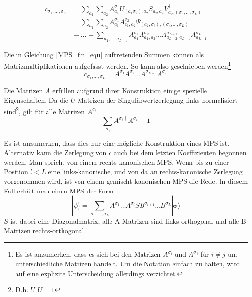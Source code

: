 \documentclass[10pt,a4paper]{report}
\newcommand{\SumIndex}{\sigma_1,\ldots,\sigma_L}
\begin{document}
\begin{equation}
\label{MPS_fin_equ}
\begin{split}
c_{\SumIndex}&=\sum_{a_1}\sum_{a_2}A_{a_1}^{\sigma_1}U_{(a_1 \sigma_2),a_2}S_{a_2,a_2}V_{a_2,(\sigma_3,\ldots,\sigma_L)}^\dagger\\
&=\sum_{a_1}\sum_{a_2}A_{a_1}^{\sigma_1}A_{a_1,a_2}^{\sigma_2}\Psi_{(a_2,\sigma_3),(\sigma_4,\ldots,\sigma_L)}\\
&=\ldots=\sum_{a_1,\ldots,a_{L-1}}A_{a_1}^{\sigma_1}A_{a_1,a_2}^{\sigma_2}\ldots A_{a_{L-2},a_{L-1}}^{\sigma_{L-1}}A_{a_{L-1}}^{\sigma_L}
\end{split}
\end{equation}

Die in Gleichung \ref{MPS_fin_equ} auftretenden Summen können als Matrizmultiplikationen aufgefasst werden. So kann also geschrieben werden\footnote{Es ist anzumerken, dass es sich bei den Matrizen $A^{\sigma_i}$ und $A^{\sigma_j}$ für $i\neq j$ um unterschiedliche Matrizen handelt. Um die Notation einfach zu halten, wird auf eine explizite Unterscheidung allerdings verzichtet.}
\begin{equation}
c_{\SumIndex}=A^{\sigma_1}A^{\sigma_2}\ldots A^{\sigma_{L-1}}A^{\sigma_L}
\end{equation}

Die Matrizen $A$ erfüllen aufgrund ihrer Konstruktion einige spezielle Eigenschaften. Da die $U$ Matrizen der Singulärwertzerlegung links-normalisiert sind\footnote{D.h. $U^\dagger U=1$}, gilt für alle Matrizen $A^{\sigma_i}$
\begin{equation}
\sum_{\sigma_i}A^{\sigma_i \dagger}A^{\sigma_i}=1
\end{equation}

Es ist anzumerken, dass dies nur eine mögliche Konstruktion eines MPS ist. Alternativ kann die Zerlegung von $c$ auch bei dem letzten Koeffizienten begonnen werden. Man spricht von einem rechts-kanonischen MPS. Wenn bis zu einer Position $l<L$ eine links-kanonische, und von da an rechts-kanonische Zerlegung vorgenommen wird, ist von einem gemischt-kanonischen MPS die Rede. In diesem Fall erhält man einen MPS der Form
\begin{equation}
|\psi\rangle=\sum_{\SumIndex}A^{\sigma_1}\ldots A^{\sigma_l}S B^{\sigma_{l+1}}\ldots B^{\sigma_L}|\bm{\sigma}\rangle
\end{equation}
$S$ ist dabei eine Diagonalmatrix, alle A Matrizen sind links-orthogonal und alle B Matrizen rechts-orthogonal.
\end{document}
